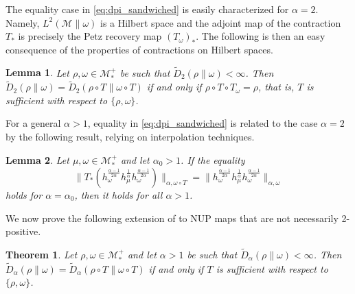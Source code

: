 \documentclass[12pt]{article}
\def\Me{\mathcal M}
\newtheorem{lemma}{Lemma}
\newtheorem{theorem}{Theorem}
\theoremstyle{definition}
\theoremstyle{remark}
\begin{document}
The equality case in \eqref{eq:dpi_sandwiched} is easily characterized for 
$\alpha=2$. Namely, $L^2(\Me\|\omega)$ is a Hilbert space and the adjoint map of the
contraction $T_*$ is precisely the Petz recovery map  $(T_\omega)_*$. The following is
then an easy consequence of the properties of contractions on Hilbert spaces.

\begin{lemma}\cite[Cor.~3.17]{jencova2018renyi} \label{lemma:sandwiched_2} Let
$\rho,\omega \in \Me_*^+$ be such that $\tilde D_2(\rho\|\omega)<\infty$. Then 
$\tilde D_2(\rho\|\omega)=\tilde D_2(\rho\circ T\|\omega\circ T)$ if and only if
$\rho\circ T\circ T_\omega=\rho$, that is, $T$ is sufficient with respect to
$\{\rho,\omega\}$. 

\end{lemma}

For a general $\alpha>1$, equality in \eqref{eq:dpi_sandwiched} is related to the case
$\alpha=2$ by the following result, relying on interpolation techniques.

\begin{lemma}\label{lemma:eq_dpi_sandwiched} \cite[Lem.~4.5]{jencova2018renyi} Let $\mu,\omega\in \Me_*^+$ and let
$\alpha_0>1$. If the equality
\[
\|T_*(h_\omega^{\frac{\alpha-1}{2\alpha}}h_\mu^{\frac1{\alpha}}h_\omega^{\frac{\alpha-1}{2\alpha}})\|_{\alpha,\omega\circ
T}=\|h_\omega^{\frac{\alpha-1}{2\alpha}}h_\mu^{\frac1{\alpha}}h_\omega^{\frac{\alpha-1}{2\alpha}}\|_{\alpha,\omega}
\]
holds for $\alpha=\alpha_0$, then it holds for all $\alpha>1$.

\end{lemma}

We now prove the following extension of \cite[Thm.~4.6]{jencova2018renyi} to NUP maps that
are not necessarily 2-positive.

\begin{theorem}\label{thm:sufficiency_sandwiched} Let $\rho,\omega\in \Me_*^+$ and let
$\alpha>1$ be such
that $\tilde D_\alpha (\rho\|\omega)<\infty$. Then 
$\tilde D_\alpha(\rho\|\omega)=\tilde D_\alpha(\rho\circ T\|\omega\circ T)$ if and only if
 $T$ is sufficient with respect to
$\{\rho,\omega\}$. 

\end{theorem}
\end{document}
